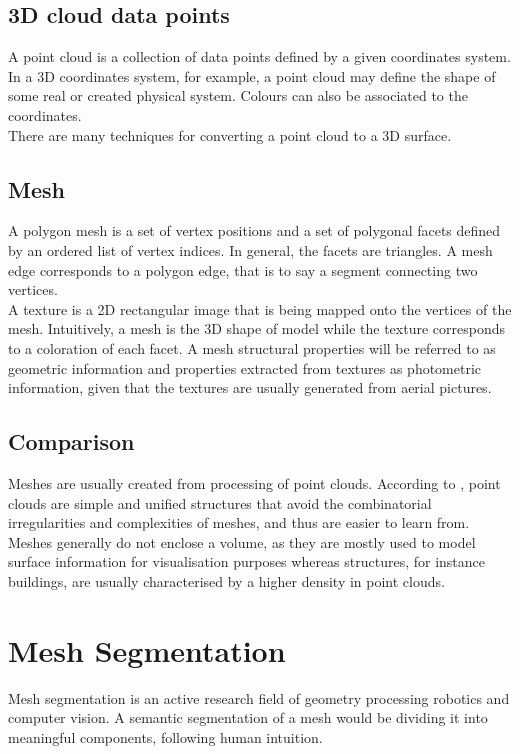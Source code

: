 \documentclass{kththesis}
\begin{document}
\subsection{3D cloud data points}
A point cloud is a collection of data points defined by a given coordinates system. In a 3D coordinates system, for example, a point cloud may define the shape of some real or created physical system. Colours can also be associated to the coordinates. \\
There are many techniques for converting a point cloud to a 3D surface.
\subsection{Mesh}
A polygon mesh is a set of vertex positions and a set of polygonal facets defined by an ordered list of vertex indices. In general, the facets are triangles. A mesh edge corresponds to a polygon edge, that is to say a segment connecting two vertices.\\
A texture is a 2D rectangular image that is being mapped onto the vertices of the mesh. Intuitively, a mesh is the 3D shape of model while the texture corresponds to a coloration of each facet. A mesh structural properties will be referred to as geometric information and properties extracted from textures as photometric information, given that the textures are usually generated from aerial pictures. 
\subsection{Comparison}
Meshes are usually created from processing of point clouds. According to \parencite{class3D},  point clouds are simple and unified structures that avoid the
combinatorial irregularities and complexities of meshes, and thus are easier to learn from. \\
Meshes generally do not enclose a volume, as they are mostly used to model surface information  for visualisation purposes whereas structures, for instance buildings, are usually characterised by a higher density in point clouds. 
\section{Mesh Segmentation}
Mesh segmentation is an active research field of geometry processing robotics and computer vision. A semantic segmentation of a mesh would be dividing it into meaningful components, following human intuition.\\
\end{document}
